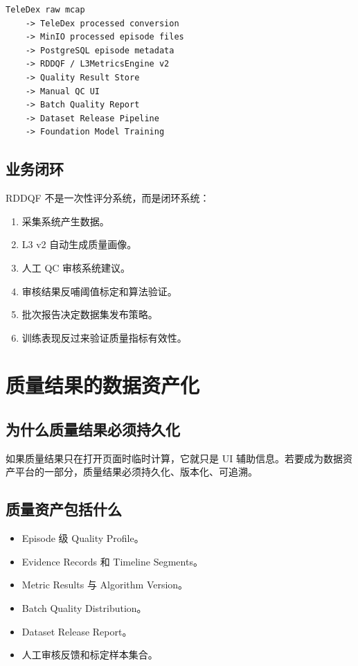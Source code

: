 \documentclass[UTF8,zihao=-4]{ctexart}
\begin{document}
\begin{verbatim}
TeleDex raw mcap
    -> TeleDex processed conversion
    -> MinIO processed episode files
    -> PostgreSQL episode metadata
    -> RDDQF / L3MetricsEngine v2
    -> Quality Result Store
    -> Manual QC UI
    -> Batch Quality Report
    -> Dataset Release Pipeline
    -> Foundation Model Training
\end{verbatim}

\subsection{业务闭环}

RDDQF 不是一次性评分系统，而是闭环系统：

\begin{enumerate}
\item 采集系统产生数据。
\item L3 v2 自动生成质量画像。
\item 人工 QC 审核系统建议。
\item 审核结果反哺阈值标定和算法验证。
\item 批次报告决定数据集发布策略。
\item 训练表现反过来验证质量指标有效性。
\end{enumerate}

\section{质量结果的数据资产化}

\subsection{为什么质量结果必须持久化}

如果质量结果只在打开页面时临时计算，它就只是 UI 辅助信息。若要成为数据资产平台的一部分，质量结果必须持久化、版本化、可追溯。

\subsection{质量资产包括什么}

\begin{itemize}
\item Episode 级 Quality Profile。
\item Evidence Records 和 Timeline Segments。
\item Metric Results 与 Algorithm Version。
\item Batch Quality Distribution。
\item Dataset Release Report。
\item 人工审核反馈和标定样本集合。
\end{itemize}
\end{document}
